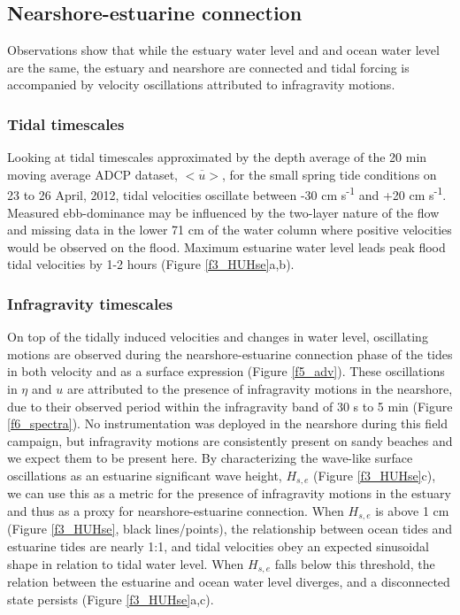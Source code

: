 \subsection{Nearshore-estuarine connection}

Observations show that while the estuary water level and and ocean
water level are the same, the estuary and nearshore are connected
and tidal forcing is accompanied by velocity oscillations attributed
to infragravity motions. 


\subsubsection{Tidal timescales}

Looking at tidal timescales approximated by the depth average of the
20 min moving average ADCP dataset, $\overline{<u>}$, for the small
spring tide conditions on 23 to 26 April, 2012, tidal velocities oscillate
between -30 cm s\textsuperscript{-1} and +20 cm s\textsuperscript{-1}.
Measured ebb-dominance may be influenced by the two-layer nature of
the flow and missing data in the lower 71 cm of the water column where
positive velocities would be observed on the flood. Maximum estuarine
water level leads peak flood tidal velocities by 1-2 hours (Figure
\ref{f3_HUHse}a,b). 


\subsubsection{Infragravity timescales}

On top of the tidally induced velocities and changes in water level,
oscillating motions are observed during the nearshore-estuarine connection
phase of the tides in both velocity and as a surface expression (Figure
\ref{f5_adv}). These oscillations in $\eta$ and $u$ are attributed
to the presence of infragravity motions in the nearshore, due to their
observed period within the infragravity band of 30 s to 5 min (Figure
\ref{f6_spectra}). No instrumentation was deployed in the nearshore
during this field campaign, but infragravity motions are consistently
present on sandy beaches \parencite{contardo_infragravity_2013} and we expect
them to be present here. By characterizing the wave-like surface oscillations
as an estuarine significant wave height, $H_{s,e}$ (Figure \ref{f3_HUHse}c),
we can use this as a metric for the presence of infragravity motions
in the estuary and thus as a proxy for nearshore-estuarine connection.
When $H_{s,e}$ is above 1 cm (Figure \ref{f3_HUHse}, black lines/points),
the relationship between ocean tides and estuarine tides are nearly
1:1, and tidal velocities obey an expected sinusoidal shape in relation
to tidal water level. When $H_{s,e}$ falls below this threshold,
the relation between the estuarine and ocean water level diverges,
and a disconnected state persists (Figure \ref{f3_HUHse}a,c).



